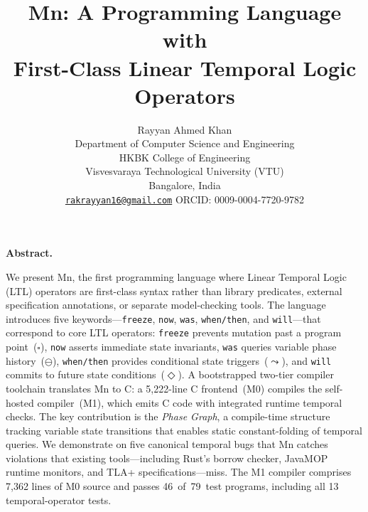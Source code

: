 \documentclass[11pt,a4paper]{article}
\renewenvironment{abstract}{%
  \begin{mdframed}[linewidth=0.6pt,linecolor=gray!50,
    backgroundcolor=gray!5,
    innerleftmargin=10pt,innerrightmargin=10pt,
    innertopmargin=8pt,innerbottommargin=8pt]
  \small\textbf{Abstract.}\enspace\ignorespaces
}{%
  \end{mdframed}
}
\begin{document}
\title{\textbf{Mn: A Programming Language with\\
First-Class Linear Temporal Logic Operators}}

\author{
  Rayyan Ahmed Khan\\[4pt]
  \small Department of Computer Science and Engineering\\
  \small HKBK College of Engineering\\
  \small Visvesvaraya Technological University (VTU)\\
  \small Bangalore, India\\[4pt]
  \small\href{mailto:rakrayyan16@gmail.com}{\texttt{rakrayyan16@gmail.com}}
  \quad\textbullet\quad
  \small ORCID: 0009-0004-7720-9782
}

\date{}
\maketitle
\thispagestyle{empty}

\begin{abstract}
We present Mn, the first programming language where Linear Temporal Logic (LTL) operators
are first-class syntax rather than library predicates, external specification annotations, or
separate model-checking tools. The language introduces five keywords---\texttt{freeze},
\texttt{now}, \texttt{was}, \texttt{when/then}, and \texttt{will}---that correspond to core LTL
operators: \texttt{freeze} prevents mutation past a program point~($\square$), \texttt{now}
asserts immediate state invariants, \texttt{was} queries variable phase history~($\ominus$),
\texttt{when/then} provides conditional state triggers~($\leadsto$), and \texttt{will} commits
to future state conditions~($\Diamond$). A bootstrapped two-tier compiler toolchain translates
Mn to C: a 5,222-line C frontend~(M0) compiles the self-hosted compiler~(M1), which emits C
code with integrated runtime temporal checks. The key contribution is the \emph{Phase Graph},
a compile-time structure tracking variable state transitions that enables static constant-folding
of temporal queries. We demonstrate on five canonical temporal bugs that Mn catches violations
that existing tools---including Rust's borrow checker, JavaMOP runtime monitors, and TLA+
specifications---miss. The M1 compiler comprises 7,362 lines of M0 source and passes
46~of~79~test programs, including all 13 temporal-operator tests.
\end{abstract}
\end{document}
